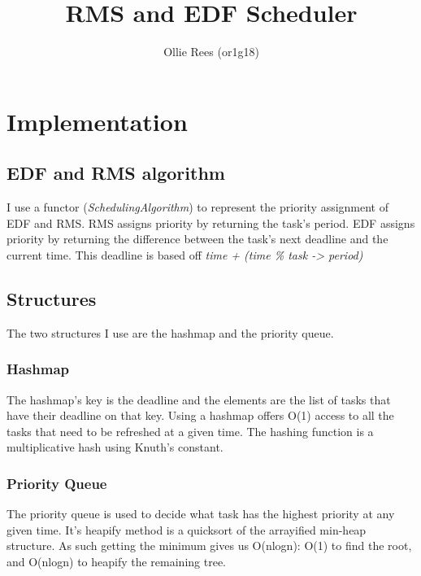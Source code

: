 \documentclass{article}
\title{RMS and EDF Scheduler}
\author{Ollie Rees (or1g18)}
\begin{document}
    \maketitle
    \tableofcontents
    \section{Implementation}
    \subsection{EDF and RMS algorithm}
    I use a functor (\textit{SchedulingAlgorithm}) to represent the priority assignment of EDF and RMS. \newline \newline
    RMS assigns priority by returning the task's period. \newline \newline 
    EDF assigns priority by returning the difference between the task's next deadline and the current time. \newline 
    This deadline is based off \textit{time + (time \% task -> period)} 
    \subsection{Structures}
    The two structures I use are the hashmap and the priority queue. \newline
    \subsubsection{Hashmap}
    The hashmap's key is the deadline and the elements are the list of tasks that have their deadline on that key. 
    \newline
    Using a hashmap offers O(1) access to all the tasks that need to be refreshed at a given time. 
    \newline
    The hashing function is a multiplicative hash using Knuth's constant.
    \subsubsection{Priority Queue}
    The priority queue is used to decide what task has the highest priority at any given time. \newline
    It's heapify method is a quicksort of the arrayified min-heap structure. \newline
    As such getting the minimum gives us O(nlogn): O(1) to find the root, and O(nlogn) to heapify the remaining tree. 
\end{document}
